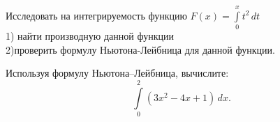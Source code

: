 \begin{task}
    Исследовать на интегрируемость функцию $F(x) = \int\limits_0^x t^2 \, dt$ \\
    1) найти производную данной функции \\
    2)проверить формулу Ньютона-Лейбница для данной функции.
\end{task}

\begin{task}
Используя формулу Ньютона--Лейбница, вычислите: \\
\[
\int\limits_0^2 (3x^2-4x+1)\,dx.
\]
\end{task}

